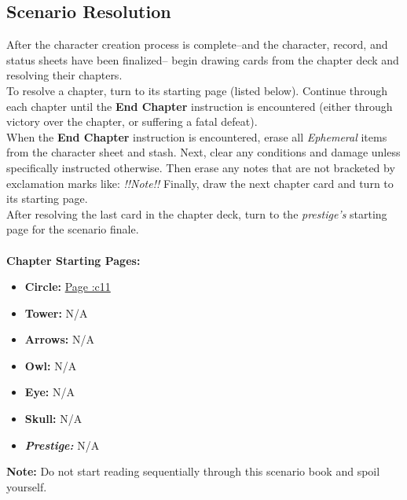 \documentclass[12pt]{article}
\begin{document}
\begin{multicols*}{2}
\subsection{Scenario Resolution}
\label{scenres}\hypertarget{scenres}{}
After the character creation process is complete--and the character, record, and status sheets have been finalized-- begin drawing cards from the chapter deck and resolving their chapters.\\
To resolve a chapter, turn to its starting page (listed below). Continue through each chapter until the \textbf{End Chapter} instruction is encountered (either through victory over the chapter, or suffering a fatal defeat).\\
When the \textbf{End Chapter} instruction is encountered, erase all \emph{Ephemeral} items from the character sheet and stash. Next, clear any conditions and damage unless specifically instructed otherwise. Then erase any notes that are not bracketed by exclamation marks like: \emph{!!Note!!} Finally, draw the next chapter card and turn to its starting page.\\
After resolving the last card in the chapter deck, turn to the \emph{prestige’s} starting page for the scenario finale.\\
\ \\
\textbf{Chapter Starting Pages:}
\begin{itemize}
\item \textbf{Circle:} \hyperlink{c11}{Page \pageref{c11}:c11}
\item \textbf{Tower:} N/A %
\item \textbf{Arrows:} N/A %
\item \textbf{Owl:} N/A %
\item \textbf{Eye:} N/A %
\item \textbf{Skull:} N/A %
\item \textbf{\emph{Prestige:}} N/A %
\end{itemize}

\begin{tcolorbox}
\textbf{Note:} Do not start reading sequentially through this scenario book and spoil yourself.
\end{tcolorbox}

\vspace*{\fill}
\pagebreak


\end{multicols*}
\end{document}
